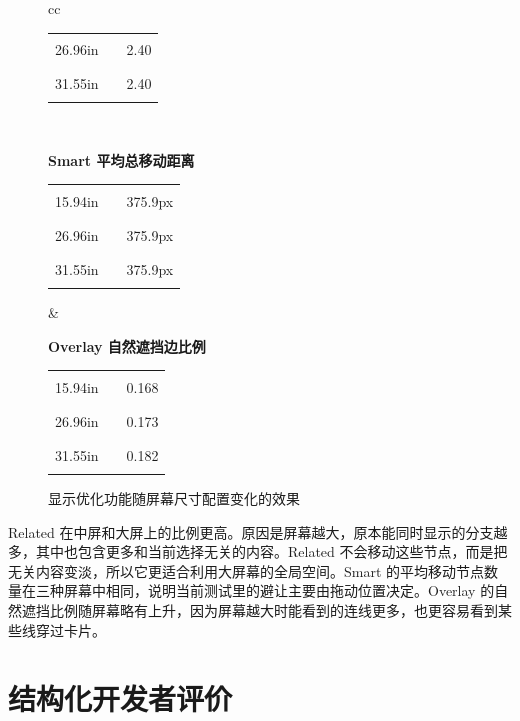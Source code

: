 \documentclass[11pt,a4paper,oneside,extrafontsizes]{memoir}
\begin{document}
\begin{center}
\begin{figure}[htbp]
\begin{tabular}{cc}
\begin{minipage}[t]{0.46\textwidth}
\begin{tabular}{@{}r l r@{}}
26.96in & \textcolor{blue!70!black}{\rule{0.2000\textwidth}{1.1ex}} & 2.40 \\
31.55in & \textcolor{blue!70!black}{\rule{0.2000\textwidth}{1.1ex}} & 2.40 \\
\end{tabular}
\end{minipage} \\[1.2em]
\begin{minipage}[t]{0.46\textwidth}
\centering
\textbf{Smart 平均总移动距离}\\[-0.2em]
\begin{tabular}{@{}r l r@{}}
15.94in & \textcolor{blue!70!black}{\rule{0.2000\textwidth}{1.1ex}} & 375.9px \\
26.96in & \textcolor{blue!70!black}{\rule{0.2000\textwidth}{1.1ex}} & 375.9px \\
31.55in & \textcolor{blue!70!black}{\rule{0.2000\textwidth}{1.1ex}} & 375.9px \\
\end{tabular}
\end{minipage}
&
\begin{minipage}[t]{0.46\textwidth}
\centering
\textbf{Overlay 自然遮挡边比例}\\[-0.2em]
\begin{tabular}{@{}r l r@{}}
15.94in & \textcolor{blue!70!black}{\rule{0.1843\textwidth}{1.1ex}} & 0.168 \\
26.96in & \textcolor{blue!70!black}{\rule{0.1901\textwidth}{1.1ex}} & 0.173 \\
31.55in & \textcolor{blue!70!black}{\rule{0.2000\textwidth}{1.1ex}} & 0.182 \\
\end{tabular}
\end{minipage}
\end{tabular}
\caption{显示优化功能随屏幕尺寸配置变化的效果}
\label{fig:display-screen-metrics}
\end{figure}

\end{center}

Related 在中屏和大屏上的比例更高。原因是屏幕越大，原本能同时显示的分支越多，其中也包含更多和当前选择无关的内容。Related 不会移动这些节点，而是把无关内容变淡，所以它更适合利用大屏幕的全局空间。Smart 的平均移动节点数量在三种屏幕中相同，说明当前测试里的避让主要由拖动位置决定。Overlay 的自然遮挡比例随屏幕略有上升，因为屏幕越大时能看到的连线更多，也更容易看到某些线穿过卡片。

\section{结构化开发者评价}
\end{document}
